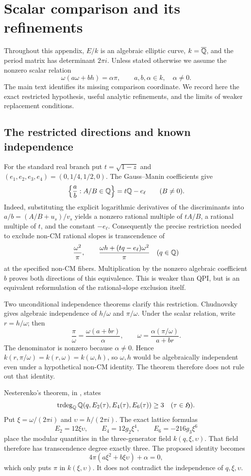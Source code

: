 \section{Scalar comparison and its refinements}\label{rev:app-comparison}

Throughout this appendix, $E/k$ is an algebraic elliptic curve,
$k=\overline{\mathbb Q}$, and the period matrix has determinant $2\pi i$.
Unless stated otherwise we assume the nonzero scalar relation
\[
 \omega(a\omega+bh)=\alpha\pi,\qquad a,b,\alpha\in k,
 \quad\alpha\ne0.
\]
The main text identifies its missing comparison coordinate.  We record
here the exact restricted hypothesis, useful analytic refinements,
and the limits of weaker replacement conditions.

\subsection{The restricted directions and known independence}
For the standard real branch put $t=\sqrt{1-z}$ and
$(e_1,e_2,e_3,e_4)=(0,1/4,1/2,0)$.  The Gauss--Manin coefficients
give
\[
 \left\{\frac ab:A/B\in\mathbb Q\right\}=t\mathbb Q-e_\ell
 \qquad(B\ne0).
\]
Indeed, substituting the explicit logarithmic derivatives of the
discriminants into $a/b=(A/B+u_s)/v_s$ yields a nonzero rational
multiple of $tA/B$, a rational multiple of $t$, and the constant
$-e_\ell$.  Consequently the precise restriction needed to exclude
non-CM rational slopes is transcendence of
\[
 \frac{\omega^2}{\pi},\qquad
 \frac{\omega h+(tq-e_\ell)\omega^2}{\pi}\quad(q\in\mathbb Q)
\]
at the specified non-CM fibers.  Multiplication by the nonzero
algebraic coefficient $b$ proves both directions of this equivalence.
This is weaker than QPI, but is an equivalent reformulation of the
rational-slope exclusion itself.

Two unconditional independence theorems clarify this restriction.
Chudnovsky gives algebraic independence of $h/\omega$ and
$\pi/\omega$.  Under the scalar relation, write $r=h/\omega$; then
\[
 \frac\pi\omega=\frac{\omega(a+br)}\alpha,
 \qquad
 \omega=\frac{\alpha(\pi/\omega)}{a+br}.
\]
The denominator is nonzero because $\alpha\ne0$.  Hence
$k(r,\pi/\omega)=k(r,\omega)=k(\omega,h)$, so $\omega,h$ would
be algebraically independent even under a hypothetical non-CM identity.
The theorem therefore does not rule out that identity.

Nesterenko's theorem, in \cite[Theorem~1.1]{Fonseca}, states
\[
 \operatorname{trdeg}_{\mathbb Q}\mathbb Q(q,E_2(\tau),E_4(\tau),E_6(\tau))\ge3
 \quad(\tau\in\mathfrak H).
\]
Put $\xi=\omega/(2\pi i)$ and $\upsilon=h/(2\pi i)$.
The exact lattice formulas
\[
 E_2=12\xi\upsilon,\qquad E_4=12g_2\xi^4,\qquad
 E_6=-216g_3\xi^6
\]
place the modular quantities in the three-generator field
$k(q,\xi,\upsilon)$.  That field therefore has transcendence degree
exactly three.  The proposed identity becomes
\[
 4\pi(a\xi^2+b\xi\upsilon)+\alpha=0,
\]
which only puts $\pi$ in $k(\xi,\upsilon)$.  It does not contradict
the independence of $q,\xi,\upsilon$.


